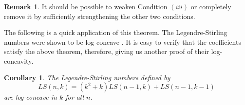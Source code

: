 \documentclass{article}
\newtheorem{corollary}[theorem]{Corollary}
\theoremstyle{definition}
\newtheorem*{remark}{Remark}
\numberwithin{equation}{section}
\begin{document}
\begin{remark}
    It should be possible to weaken Condition $(iii)$ or completely remove it by sufficiently strengthening the other two conditions.
\end{remark}

The following is a quick application of this theorem. The Legendre-Stirling numbers were shown to be log-concave \cite{andrews-legendre-stirling}. It is easy to verify that the coefficients satisfy the above theorem, therefore, giving us another proof of their log-concavity.
\begin{corollary}
    The Legendre-Stirling numbers defined by
    \begin{equation}
        LS(n,k)=(k^2+k)LS(n-1,k)+LS(n-1,k-1)
    \end{equation}
    are log-concave in $k$ for all $n$.
\end{corollary}
\end{document}
